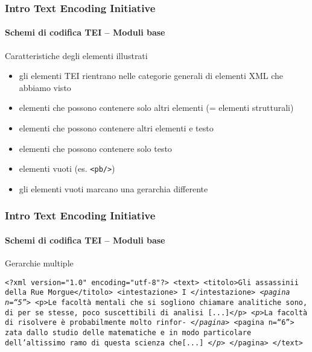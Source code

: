 \begin{frame}
	\frametitle{Intro Text Encoding Initiative}
	\framesubtitle{Schemi di codifica TEI – Moduli base}
	\addtocounter{nframe}{1}

	\begin{block}{Caratteristiche degli elementi illustrati}
        \begin{itemize}
            \item gli elementi TEI rientrano nelle categorie generali di
            elementi XML che abbiamo visto
            \item elementi che possono contenere solo altri elementi (=
            elementi strutturali)
            \item elementi che possono contenere altri elementi e testo
            \item elementi che possono contenere solo testo
            \item  elementi vuoti (es. \texttt{<pb/>})
            \item  gli elementi vuoti marcano una gerarchia differente
        \end{itemize}
    \end{block}
\end{frame}


\begin{frame}
	\frametitle{Intro Text Encoding Initiative}
	\framesubtitle{Schemi di codifica TEI – Moduli base}
	\addtocounter{nframe}{1}

	\begin{block}{Gerarchie multiple}
        
        \texttt{<?xml version="1.0" encoding="utf-8"?>
        <text>
        <titolo>Gli assassinii della Rue Morgue</titolo>
        <intestazione> I </intestazione>
        \emph{<pagina n=``5''>}
        <p>Le facoltà mentali che si sogliono chiamare analitiche sono, di
        per se stesse, poco suscettibili di analisi [...]</p>
        \emph{<p>}La facoltà di risolvere è probabilmente molto rinfor-
        \emph{</pagina>}
        <pagina n=``6''>
        zata dallo studio delle matematiche e in modo particolare
        dell’altissimo ramo di questa scienza che[...] \emph{</p>}
        </pagina>
        </text>}
    \end{block}

\end{frame}



